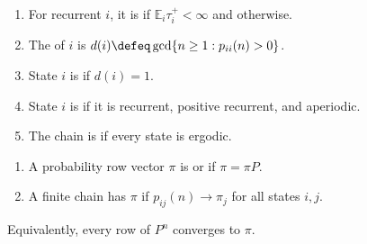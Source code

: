 \begin{definition} \label{def:markov-period-ergodic-state} 
\begin{enumerate}[label=(\roman*)]
\setlength{\itemsep}{0pt}
\item For recurrent $i$, it is  if $\mathbb{E}_i\tau_i^+<\infty$ and  otherwise.
\item The  of $i$ is $d(i)\defeq\gcd\{n\geq1:p_{ii}(n)>0\}$.
\item State $i$ is  if $d(i)=1$.
\item State $i$ is  if it is recurrent, positive recurrent, and aperiodic.
\item The chain is  if every state is ergodic.
\end{enumerate}
\end{definition}

\begin{definition} \label{def:markov-stationary-limiting-distributions} 
\begin{enumerate}[label=(\roman*)]
\setlength{\itemsep}{0pt}
\item A probability row vector $\pi$ is  or  if $\pi=\pi P$.
\item A finite chain has  $\pi$ if $p_{ij}(n)\to\pi_j$ for all states $i,j$.
\end{enumerate}
Equivalently, every row of $P^n$ converges to $\pi$.
\end{definition}

